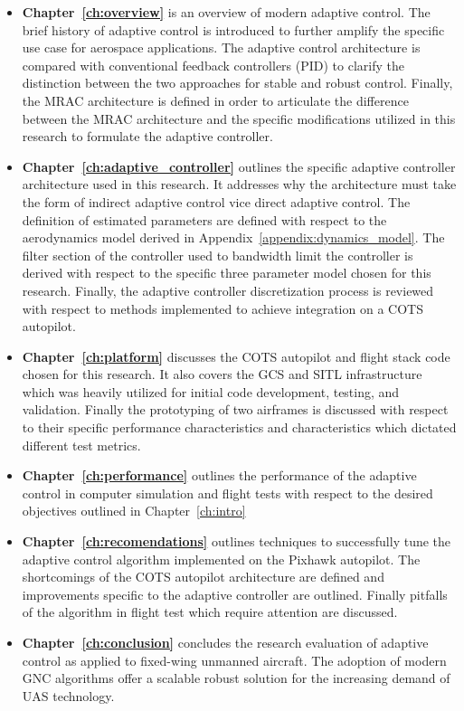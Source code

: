 \begin{itemize}
\item \textbf{Chapter~\ref{ch:overview}} is an overview of modern adaptive control.  The brief history of adaptive control is introduced to further amplify the specific use case for aerospace applications.  The adaptive control architecture is compared with conventional feedback controllers (\ac{PID}) to clarify the distinction between the two approaches for stable and robust control.  Finally, the \ac{MRAC} architecture is defined in order to articulate the difference between the \ac{MRAC} architecture and the specific modifications utilized in this research to formulate the \Lone adaptive controller.
\item \textbf{Chapter~\ref{ch:adaptive_controller}} outlines the specific \Lone adaptive controller architecture used in this research.  It addresses why the architecture must take the form of indirect adaptive control vice direct adaptive control.  The definition of estimated parameters are defined with respect to the aerodynamics model derived in Appendix~\ref{appendix:dynamics_model}.  The filter section of the controller used to bandwidth limit the controller is derived with respect to the specific three parameter model chosen for this research.  Finally, the \Lone adaptive controller discretization process is reviewed with respect to methods implemented to achieve integration on a \ac{COTS} autopilot.
\item \textbf{Chapter~\ref{ch:platform}} discusses the \ac{COTS} autopilot and flight stack code chosen for this research.  It also covers the \ac{GCS} and \ac{SITL} infrastructure which was heavily utilized for initial code development, testing, and validation.  Finally the prototyping of two airframes is discussed with respect to their specific performance characteristics and characteristics which dictated different test metrics.
\item \textbf{Chapter~\ref{ch:performance}} outlines the performance of the \Lone adaptive control in computer simulation and flight tests with respect to the desired objectives outlined in Chapter~\ref{ch:intro}
\item \textbf{Chapter~\ref{ch:recomendations}} outlines techniques to successfully tune the \Lone adaptive control algorithm implemented on the Pixhawk autopilot.   The shortcomings of the \ac{COTS} autopilot architecture are defined and improvements specific to the \Lone adaptive controller are outlined.  Finally pitfalls of the algorithm in flight test which require attention are discussed.
\item \textbf{Chapter~\ref{ch:conclusion}} concludes the research evaluation of \Lone adaptive control as applied to fixed-wing unmanned aircraft.   The adoption of modern \ac{GNC} algorithms offer a scalable robust solution for the increasing demand of \ac{UAS} technology.

\end{itemize}





